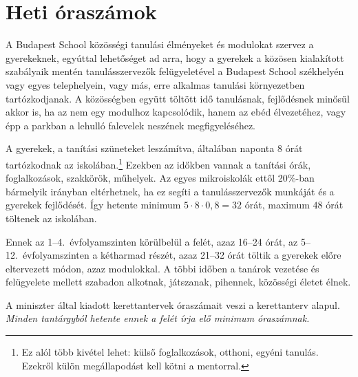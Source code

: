 \section{Heti óraszámok}

A Budapest School közösségi tanulási élményeket és modulokat szervez a gyerekeknek, egyúttal lehetőséget ad arra, hogy a gyerekek a közösen kialakított szabályaik mentén tanulásszervezők felügyeletével a Budapest School székhelyén vagy egyes telephelyein, vagy más, erre alkalmas tanulási környezetben tartózkodjanak. A közösségben együtt töltött idő tanulásnak, fejlődésnek minősül akkor is, ha az nem egy modulhoz kapcsolódik, hanem az ebéd élvezetéhez, vagy épp a parkban a lehulló falevelek neszének megfigyeléséhez.

A gyerekek, a tanítási szüneteket leszámítva, általában naponta 8 órát tartózkodnak az iskolában.\footnote{Ez alól több kivétel lehet: külső foglalkozások, otthoni, egyéni tanulás. Ezekről külön megállapodást kell kötni a mentorral.} Ezekben az időkben vannak a tanítási órák, foglalkozások, szakkörök, műhelyek. Az egyes mikroiskolák ettől 20\%-ban bármelyik irányban eltérhetnek, ha ez segíti a tanulásszervezők munkáját és a gyerekek fejlődését. Így hetente minimum $5 \cdot 8 \cdot 0,8 = 32$ órát, maximum $48$ órát töltenek az iskolában.

Ennek az 1--4.~évfolyamszinten körülbelül a felét, azaz 16--24 órát, az 5--12.~évfolyamszinten a  kétharmad részét, azaz 21--32 órát töltik a gyerekek előre eltervezett módon, azaz modulokkal. A többi időben a tanárok vezetése és felügyelete mellett szabadon alkotnak, játszanak, pihennek, közösségi életet élnek.

A miniszter által kiadott kerettantervek óraszámait veszi a kerettanterv alapul. \emph{Minden tantárgyból hetente ennek a felét írja elő minimum óraszámnak.}

